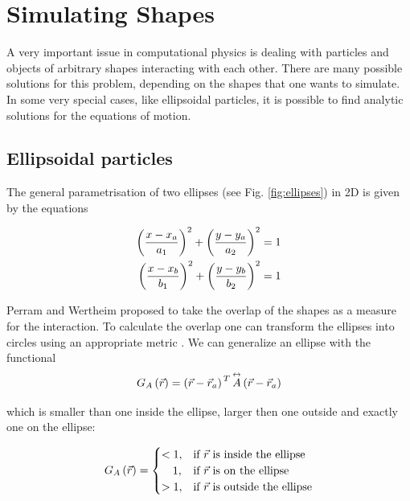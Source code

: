 


\section{Simulating Shapes}


A very important issue in computational physics is dealing with particles and objects of arbitrary shapes interacting with each other. There are many possible solutions for this problem, depending on the shapes that one wants to simulate. In some very special cases, like ellipsoidal particles, it is possible to find analytic solutions for the equations of motion.



\subsection{Ellipsoidal particles}

The general parametrisation of two ellipses (see Fig. \ref{fig:ellipses}) in 2D is given by the equations

\begin{align*}
\left(\frac{x-x_a}{a_1}\right)^2 + \left(\frac{y-y_a}{a_2}\right)^2 &= 1\\
\left(\frac{x-x_b}{b_1}\right)^2 + \left(\frac{y-y_b}{b_2}\right)^2 &= 1
\end{align*}


Perram and Wertheim \citep{perram} proposed to take the overlap of the shapes as a measure for the interaction. To calculate the overlap one can transform the ellipses into circles using an appropriate metric \citep{comp_phys}. We can generalize an ellipse with the functional 
\begin{equation}
G_A\left(\vec{r}\right) = \left(\vec{r}-\vec{r}_a\right)^{\,T} \overset{\leftrightarrow}{A} \left(\vec{r}-\vec{r}_a\right)
\label{eq:ellipse_func}
\end{equation}

which is smaller than one inside the ellipse, larger then one outside and exactly one on the ellipse:

\begin{equation}
G_A\left(\vec{r}\right) =\begin{cases}
  <1,  & \text{if } \vec{r} \text{ is inside the ellipse}\\
  \,\,\,\,\,\,1,  & \text{if } \vec{r} \text{ is on the ellipse}\\
  >1,  & \text{if } \vec{r} \text{ is outside the ellipse}
\end{cases}
\end{equation}



